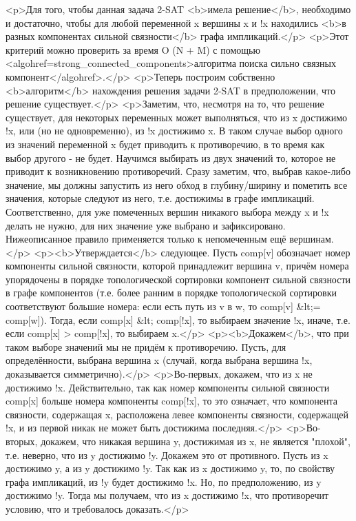 <p>Для того, чтобы данная задача 2-SAT <b>имела решение</b>, необходимо и достаточно, чтобы для любой переменной x вершины x и !x находились <b>в разных компонентах сильной связности</b> графа импликаций.</p>
<p>Этот критерий можно проверить за время O (N + M) с помощью <algohref=strong_connected_components>алгоритма поиска сильно связных компонент</algohref>.</p>
<p>Теперь построим собственно <b>алгоритм</b> нахождения решения задачи 2-SAT в предположении, что решение существует.</p>
<p>Заметим, что, несмотря на то, что решение существует, для некоторых переменных может выполняться, что из x достижимо !x, или (но не одновременно), из !x достижимо x. В таком случае выбор одного из значений переменной x будет приводить к противоречию, в то время как выбор другого - не будет. Научимся выбирать из двух значений то, которое не приводит к возникновению противоречий. Сразу заметим, что, выбрав какое-либо значение, мы должны запустить из него обход в глубину/ширину и пометить все значения, которые следуют из него, т.е. достижимы в графе импликаций. Соответственно, для уже помеченных вершин никакого выбора между x и !x делать не нужно, для них значение уже выбрано и зафиксировано. Нижеописанное правило применяется только к непомеченным ещё вершинам.</p>
<p><b>Утверждается</b> следующее. Пусть comp[v] обозначает номер компоненты сильной связности, которой принадлежит вершина v, причём номера упорядочены в порядке топологической сортировки компонент сильной связности в графе компонентов (т.е. более ранним в порядке топологической сортировки соответствуют большие номера: если есть путь из v в w, то comp[v] &lt;= comp[w]). Тогда, если comp[x] &lt; comp[!x], то выбираем значение !x, иначе, т.е. если comp[x] > comp[!x], то выбираем x.</p>
<p><b>Докажем</b>, что при таком выборе значений мы не придём к противоречию. Пусть, для определённости, выбрана вершина x (случай, когда выбрана вершина !x, доказывается симметрично).</p>
<p>Во-первых, докажем, что из x не достижимо !x. Действительно, так как номер компоненты сильной связности comp[x] больше номера компоненты comp[!x], то это означает, что компонента связности, содержащая x, расположена левее компоненты связности, содержащей !x, и из первой никак не может быть достижима последняя.</p>
<p>Во-вторых, докажем, что никакая вершина y, достижимая из x, не является "плохой", т.е. неверно, что из y достижимо !y. Докажем это от противного. Пусть из x достижимо y, а из y достижимо !y. Так как из x достижимо y, то, по свойству графа импликаций, из !y будет достижимо !x. Но, по предположению, из y достижимо !y. Тогда мы получаем, что из x достижимо !x, что противоречит условию, что и требовалось доказать.</p>

